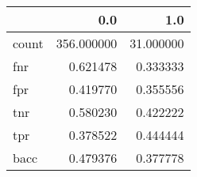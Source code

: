\begin{tabular}{lrr}
\toprule
{} &         0.0 &        1.0 \\
\midrule
count &  356.000000 &  31.000000 \\
fnr   &    0.621478 &   0.333333 \\
fpr   &    0.419770 &   0.355556 \\
tnr   &    0.580230 &   0.422222 \\
tpr   &    0.378522 &   0.444444 \\
bacc  &    0.479376 &   0.377778 \\
\bottomrule
\end{tabular}
